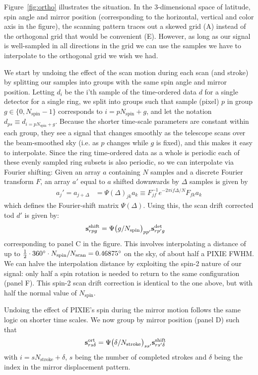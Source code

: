 \documentclass{article}
\renewcommand{\vec}[1]{{\bf #1}}
\begin{document}
Figure~\ref{fig:ortho} illustrates the situation. In the 3-dimensional
space of latitude, spin angle and mirror position (corresponding to the
horizontal, vertical and color axis in the figure), the scanning pattern
traces out a skewed grid (A) instead of the orthogonal grid
that would be convenient (E). However, as long as our signal is well-sampled
in all directions in the grid we can use the samples we have to
interpolate to the orthogonal grid we wish we had.

We start by undoing the effect of the scan motion during each scan (and stroke)
by splitting our samples into groups with the same spin angle and mirror position.
Letting $d_i$ be the i'th sample of the time-ordered data $d$ for a single detector
for a single ring, we split into groups such that
sample (pixel) $p$ in group $g \in \{0,N_\textrm{spin}-1\}$ corresponds to
$i = pN_\textrm{spin}+g$, and let the notation $d_{ps} \equiv d_{i=pN_\textrm{spin}+g}$.
Because the shorter time-scale parameters are constant within each group, they see
a signal that changes smoothly as the telescope scans over the beam-smoothed sky
(i.e. as $p$ changes while $g$ is fixed),
and this makes it easy to interpolate. Since the ring time-ordered data as a whole
is periodic each of these evenly sampled ring subsets is also periodic, so we
can interpolate via Fourier shifting: Given an array $a$ containing $N$ samples and a discrete Fourier transform $F$,
an array $a'$ equal to $a$ shifted downwards by $\Delta$ samples is given by
\begin{align}
	a_j' = a_{j+\Delta} &= \Psi(\Delta)_{jk} a_k \equiv F^{-1}_{jf} e^{-2\pi if\Delta/N} F_{fk} a_k
\end{align}
which defines the Fourier-shift matrix $\Psi(\Delta)$. Using this,
the scan drift corrected tod $d'$ is given by:
\begin{align}
	\vec s^\textrm{shift}_{rpg} &= \Psi\big(g/N_\textrm{spin}\big)_{pp'} \vec s^\textrm{det}_{rp'g}
\end{align}
corresponding to panel C in the figure. This involves interpolating
a distance of up to $\frac12\cdot 360\degree\cdot N_\textrm{spin}/N_\textrm{scan}
= 0.46875\degree$ on the sky, of about half a PIXIE FWHM. We can halve the
interpolation distance by exploiting the spin-2 nature of our signal:
only half a spin rotation is needed to return to the same configuration (panel F).
This spin-2 scan drift correction is identical to the one above, but with
half the normal value of $N_\textrm{spin}$.

Undoing the effect of PIXIE's spin during the mirror motion follows the same
logic on shorter time scales. We now group by mirror position (panel D)
such that
\begin{align}
	\vec s^\textrm{ort}_{rs\delta} &= \Psi\big(\delta/N_\textrm{stroke}\big)_{ss'} \vec s^\textrm{shift}_{rs'\delta}
\end{align}
with $i = sN_\textrm{stroke}+\delta$, $s$ being the number of completed strokes
and $\delta$ being the index in the mirror displacement pattern.
\end{document}

